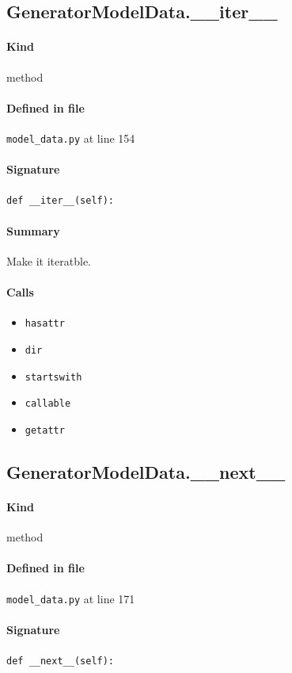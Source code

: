\documentclass[11pt]{report}
\begin{document}
\subsection{GeneratorModelData.\_\_iter\_\_}
\label{def:model_data.py:GeneratorModelData.__iter__:L154}
\paragraph{Kind} method
\paragraph{Defined in file} \texttt{model\_data.py} at line 154
\paragraph{Signature} \texttt{def \_\_iter\_\_(self):}
\paragraph{Summary} Make it iteratble.
\paragraph{Calls}
\begin{itemize}[leftmargin=*]
  \item \texttt{hasattr}
  \item \texttt{dir}
  \item \texttt{startswith}
  \item \texttt{callable}
  \item \texttt{getattr}
\end{itemize}
\subsection{GeneratorModelData.\_\_next\_\_}
\label{def:model_data.py:GeneratorModelData.__next__:L171}
\paragraph{Kind} method
\paragraph{Defined in file} \texttt{model\_data.py} at line 171
\paragraph{Signature} \texttt{def \_\_next\_\_(self):}
\end{document}
